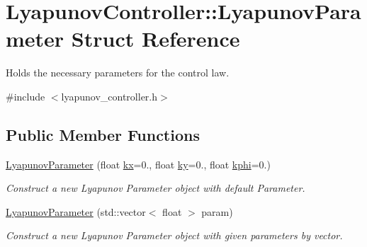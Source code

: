 \hypertarget{structLyapunovController_1_1LyapunovParameter}{}\section{Lyapunov\+Controller\+:\+:Lyapunov\+Parameter Struct Reference}
\label{structLyapunovController_1_1LyapunovParameter}


Holds the necessary parameters for the control law.  




{\ttfamily \#include $<$lyapunov\+\_\+controller.\+h$>$}

\subsection*{Public Member Functions}
\begin{DoxyCompactItemize}
\item 
\mbox{\label{structLyapunovController_1_1LyapunovParameter_afc872afae50a2b135bbae2914a7fa8c2}} 
\hyperlink{structLyapunovController_1_1LyapunovParameter_afc872afae50a2b135bbae2914a7fa8c2}{Lyapunov\+Parameter} (float \hyperlink{structLyapunovController_1_1LyapunovParameter_af45ecc57706f7d6b9d1fcdf2fd355fc2}{kx}=0., float \hyperlink{structLyapunovController_1_1LyapunovParameter_afcdfaafefdbafdc6cca6b2db8a45fe3a}{ky}=0., float \hyperlink{structLyapunovController_1_1LyapunovParameter_a823275a2d5ddd96019b3d69ea327c95c}{kphi}=0.)
\begin{DoxyCompactList}\small\item\em Construct a new Lyapunov Parameter object with default Parameter. \end{DoxyCompactList}\item 
\hyperlink{structLyapunovController_1_1LyapunovParameter_adb9af92d34ab58d439388000eab5deeb}{Lyapunov\+Parameter} (std\+::vector$<$ float $>$ param)
\begin{DoxyCompactList}\small\item\em Construct a new Lyapunov Parameter object with given parameters by vector. \end{DoxyCompactList}\end{DoxyCompactItemize}
